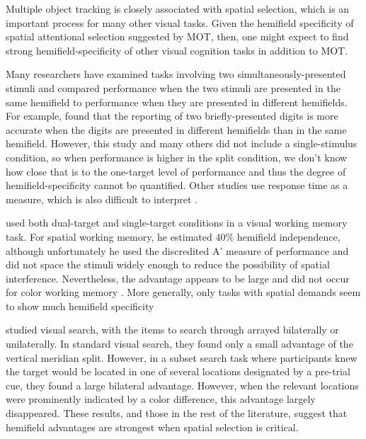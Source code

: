 \documentclass[
]{book}
\begin{document}
Multiple object tracking is closely associated with spatial selection, which is an important process for many other visual tasks. Given the hemifield specificity of spatial attentional selection suggested by MOT, then, one might expect to find strong hemifield-specificity of other visual cognition tasks in addition to MOT.

Many researchers have examined tasks involving two simultaneously-presented stimuli and compared performance when the two stimuli are presented in the same hemifield to performance when they are presented in different hemifields. For example, \citet{dimondUseTwoCerebral1971} found that the reporting of two briefly-presented digits is more accurate when the digits are presented in different hemifields than in the same hemifield. However, this study and many others did not include a single-stimulus condition, so when performance is higher in the split condition, we don't know how close that is to the one-target level of performance and thus the degree of hemifield-specificity cannot be quantified. Other studies use response time as a measure, which is also difficult to interpret \citep{awhEvidenceSplitAttentional2000, serenoDiscriminationHemifieldsNew1991, dimondUseTwoCerebral1971}.

\citet{delvenneCapacityVisualShortterm2005} used both dual-target and single-target conditions in a visual working memory task. For spatial working memory, he estimated 40\% hemifield independence, although unfortunately he used the discredited A' measure of performance \citep{zhangNoteROCAnalysis2005} and did not space the stimuli widely enough to reduce the possibility of spatial interference. Nevertheless, the advantage appears to be large and did not occur for color working memory \citep{delvenneVisualShorttermMemory2012}. More generally, only tasks with spatial demands seem to show much hemifield specificity \citep{holtBilateralAdvantageMaintaining2015, umemotoBilateralAdvantageStorage2010}

\citet{alvarezAnatomicalConstraintsAttention2012a} studied visual search, with the items to search through arrayed bilaterally or unilaterally. In standard visual search, they found only a small advantage of the vertical meridian split. However, in a subset search task where participants knew the target would be located in one of several locations designated by a pre-trial cue, they found a large bilateral advantage. However, when the relevant locations were prominently indicated by a color difference, this advantage largely disappeared. These results, and those in the rest of the literature, suggest that hemifield advantages are strongest when spatial selection is critical.
\end{document}
